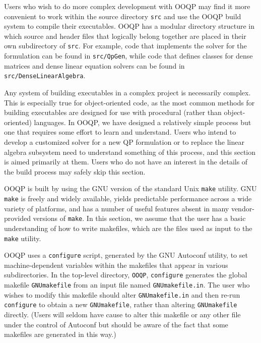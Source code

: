 Users who wish to do more complex development with OOQP may find it
more convenient to work within the source directory \texttt{src}
and use the OOQP build system to compile their executables. OOQP has a
modular directory structure in which source and header files that
logically belong together are placed in their own subdirectory of
\texttt{src}. For example, code that implements the solver for
the formulation  can be found in \texttt{src/QpGen},
while code that defines classes for dense matrices and dense linear
equation solvers can be found in \texttt{src/DenseLinearAlgebra}.


Any system of building executables in a complex project is necessarily
complex. This is especially true for object-oriented code, as the most
common methods for building executables are designed for use with
procedural (rather than object-oriented) languages. In OOQP, we have
designed a relatively simple process but one that requires some
effort to learn and understand.  Users who intend to develop a
customized solver for a new QP formulation or to replace the linear
algebra subsystem need to understand something of this process, and
this section is aimed primarily at them. Users who do not have an
interest in the details of the build process may safely skip this
section.

OOQP is built by using the GNU version of the standard Unix
\verb-make- utility. GNU \verb-make- is freely and widely available,
yields predictable performance across a wide variety of platforms, and
has a number of useful features absent in many vendor-provided
versions of \verb-make-. In this section, we assume that the user has
a basic understanding of how to write makefiles, which are the files
used as input to the \verb-make- utility.

OOQP uses a \verb-configure- script, generated by the GNU Autoconf
utility, to set machine-dependent variables within the makefiles that
appear in various subdirectories. In the top-level directory,
\texttt{OOQP}, \verb-configure- generates the global makefile
\verb-GNUmakefile- from an input file named \verb-GNUmakefile.in-.
The user who wishes to modify this makefile should alter
\verb-GNUmakefile.in- and then re-run \verb-configure- to obtain a new
\verb-GNUmakefile-, rather than altering \verb-GNUmakefile- directly.
(Users will seldom have cause to alter this makefile or any other file
under the control of Autoconf but should be aware of the fact that
some makefiles are generated in this way.)

